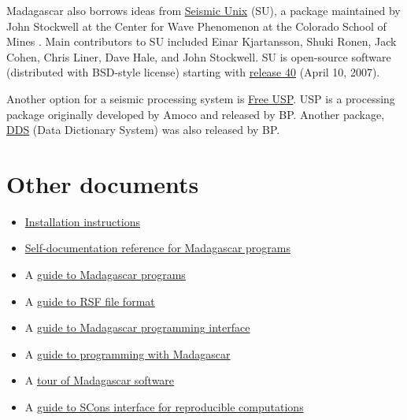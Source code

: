 Madagascar also borrows ideas from
\href{http://timna.mines.edu/cwpcodes/}{Seismic Unix} (SU), a package
maintained by John Stockwell at the Center for Wave Phenomenon at the
Colorado School of Mines \cite[]{TLE16-07-10451049,su}. Main
contributors to SU included Einar Kjartansson, Shuki Ronen, Jack
Cohen, Chris Liner, Dave Hale, and John Stockwell.  SU is open-source
software (distributed with BSD-style license) starting with
\href{ftp://ftp.cwp.mines.edu/pub/cwpcodes/news40}{release 40} (April
10, 2007).

Another option for a seismic processing system is
\href{http://www.freeusp.org/}{Free USP}. USP is a processing package
originally developed by Amoco and released by BP. Another package,
\href{http://www.freeusp.org/DDS/}{DDS} (Data Dictionary System) was
also released by BP.

\begin{comment}
None of these alternative packages can be qualified as free software
according to the
\href{http://www.fsf.org/philosophy/free-sw.html}{Free Software Foundation} or as open-source software according to the
\href{http://www.opensource.org/docs/definition.php}{Open Source Initiative}.  However, they are available for free in the source form
under certain conditions. The Madagascar package is both free and
open-source.
\end{comment}

\section{Other documents}

\begin{itemize}
\item  \href{http://egl.beg.utexas.edu/RSF/book/rsf/rsf/install_html/}{Installation instructions}
\item \href{http://egl.beg.utexas.edu/RSF/}{Self-documentation reference for Madagascar programs}
\item A \href{http://egl.beg.utexas.edu/RSF/book/rsf/rsf/prog_html/}{guide to Madagascar programs}
\item A \href{http://egl.beg.utexas.edu/RSF/book/rsf/rsf/format_html/}{guide to RSF file format}
\item A \href{http://egl.beg.utexas.edu/RSF/book/rsf/rsf/api_html/}{guide to  Madagascar programming interface}
\item A \href{http://egl.beg.utexas.edu/RSF/book/rsf/rsf/demo_html/}{guide to programming with Madagascar}
\item A \href{http://egl.beg.utexas.edu/RSF/book/rsf/rsf/tour_html/}{tour of Madagascar software}
\item A \href{http://egl.beg.utexas.edu/RSF/book/rsf/scons/paper_html/}{guide to SCons interface for reproducible computations}
\end{itemize}




%



